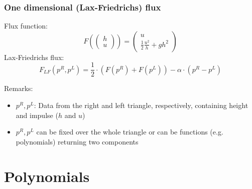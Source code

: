 \documentclass{beamer}
\newcommand{\todo}[1]{
  \textcolor{red}{TODO: #1}
  \note{\textcolor{red}{TODO: #1}}
}
\renewcommand{\todo}[1]{}
\begin{document}
\begin{frame}
  \frametitle{One dimensional (Lax-Friedrichs) flux}
  Flux function:
  \begin{equation}
    \label{eq:flux-function-definition}
    F\left(
      \begin{pmatrix}
        h \\ u
      \end{pmatrix}
    \right) =
    \begin{pmatrix}
      u \\
      \frac{1}{2} \frac{u^2}{h} + g h^2
    \end{pmatrix}
  \end{equation}
  Lax-Friedrichs flux:
  \begin{equation}
    \label{eq:lax-friedrich-definition}
    F_{LF}(p^R,p^L) = \dfrac{1}{2}\cdot (F(p^R) + F(p^L)) - \alpha \cdot (p^R - p^L)
  \end{equation}
  \begin{block}{Remarks:}
    \begin{itemize}
    \item $p^R, p^L$: Data from the right and left triangle, respectively, containing height and impulse ($h$ and $u$)
    \item $p^R, p^L$ can be fixed over the whole triangle or can be functions (e.g. polynomials) returning two components
    \todo{Muesen wir das mit fixed ueberhaupt erwaehnen? Ist ja nur ein Spezialfall von Polynomen}
    \end{itemize}
  \end{block}
\end{frame}

\section{Polynomials}
\label{sec:constructing-polynomials}
\end{document}
